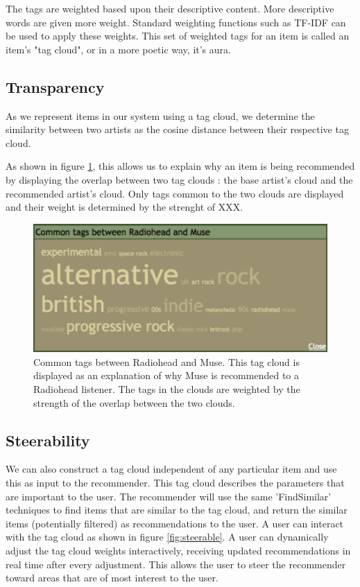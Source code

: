 \documentclass[a4paper,10pt,twocolumn]{article}
\begin{document}
The tags are weighted based upon their descriptive
content. More descriptive words are given more
weight.  Standard weighting functions such as
TF-IDF can be used to apply these weights.  This
set of weighted tags for an item is called an
item's "tag cloud", or in a more poetic way, it's aura.

\subsection{Transparency}

As we represent items in our system using 
a tag cloud, we determine the similarity between two artists as the 
cosine distance between their respective tag cloud.

As shown in figure \ref{fig:commontags}, this allows us to explain why an item is being recommended 
by displaying the overlap between two tag clouds : the base artist's cloud and the recommended artist's cloud. 
Only tags common to the two clouds are displayed and 
their weight is determined by the strenght of XXX.

\begin{figure}[ht]
\begin{center}
\includegraphics[width=0.9\columnwidth]{radiohead-muse-commontags}
\end{center}
\caption{Common tags between Radiohead and Muse. This tag cloud is displayed as an explanation of why Muse is recommended to a Radiohead listener. The tags in the clouds are weighted by the strength of the overlap between the two clouds.}
\label{fig:commontags}
\end{figure}

\subsection{Steerability}

We can also construct a tag cloud independent of
any particular item and use this as input to the
recommender. This tag cloud describes the
parameters that are important to the user.  The
recommender will use the same 'FindSimilar'
techniques to find items that are similar to the
tag cloud, and return the similar items
(potentially filtered) as recommendations to the
user.  A user can interact with the tag cloud as shown in figure \ref{fig:steerable}.  A
user can dynamically adjust the tag cloud
weights interactively, receiving updated
recommendations in real time after every adjustment. This
allows the user to steer the recommender toward
areas that are of most interest to the user.
\end{document}
